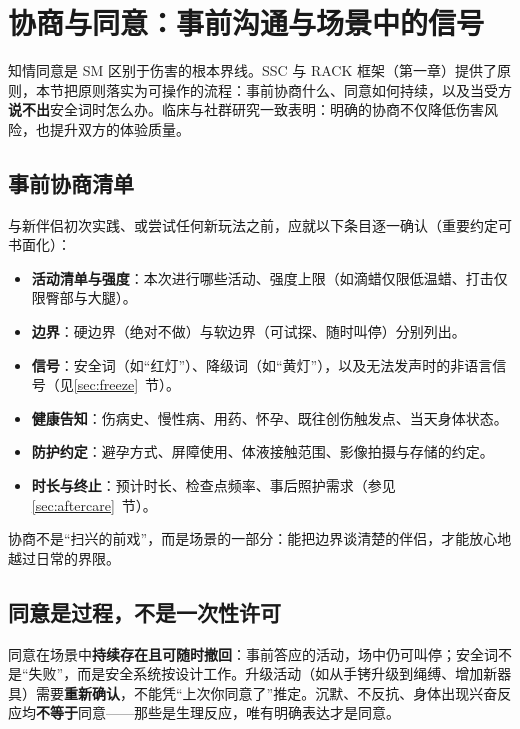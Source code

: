\documentclass[12pt,UTF8]{ctexbook}
\begin{document}
\section{协商与同意：事前沟通与场景中的信号}\label{chap:consent}

知情同意是 SM 区别于伤害的根本界线。SSC 与 RACK 框架（第一章）提供了原则，本节把原则落实为可操作的流程：事前协商什么、同意如何持续，以及当受方\textbf{说不出}安全词时怎么办。临床与社群研究一致表明：明确的协商不仅降低伤害风险，也提升双方的体验质量\citep{dunkley2020consent,deneef2019}。

\subsection{事前协商清单}

与新伴侣初次实践、或尝试任何新玩法之前，应就以下条目逐一确认（重要约定可书面化）：

\begin{itemize}
\item \textbf{活动清单与强度}：本次进行哪些活动、强度上限（如滴蜡仅限低温蜡、打击仅限臀部与大腿）。
\item \textbf{边界}：硬边界（绝对不做）与软边界（可试探、随时叫停）分别列出。
\item \textbf{信号}：安全词（如“红灯”）、降级词（如“黄灯”），以及无法发声时的非语言信号（见\ref{sec:freeze}~节）。
\item \textbf{健康告知}：伤病史、慢性病、用药、怀孕、既往创伤触发点、当天身体状态。
\item \textbf{防护约定}：避孕方式、屏障使用、体液接触范围、影像拍摄与存储的约定。
\item \textbf{时长与终止}：预计时长、检查点频率、事后照护需求（参见\ref{sec:aftercare}~节）。
\end{itemize}

协商不是“扫兴的前戏”，而是场景的一部分：能把边界谈清楚的伴侣，才能放心地越过日常的界限。

\subsection{同意是过程，不是一次性许可}

同意在场景中\textbf{持续存在且可随时撤回}：事前答应的活动，场中仍可叫停；安全词不是“失败”，而是安全系统按设计工作。升级活动（如从手铐升级到绳缚、增加新器具）需要\textbf{重新确认}，不能凭“上次你同意了”推定。沉默、不反抗、身体出现兴奋反应均\textbf{不等于}同意——那些是生理反应，唯有明确表达才是同意。
\end{document}
